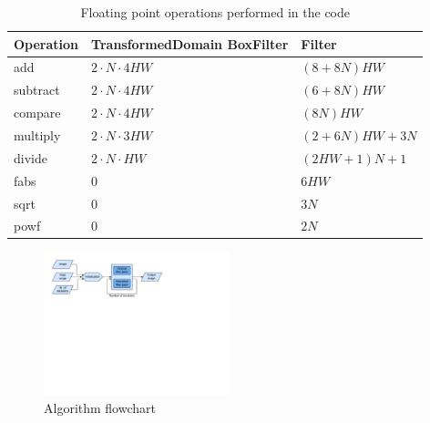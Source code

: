 \begin{table}[h]
\label{cost_analysis}
\centering
\begin{tabular}{| l | p{3cm} | p{3cm} |} \hline 
Operation & TransformedDomain BoxFilter  & Filter \\ \hline
add & $2 \cdot N \cdot 4HW$ & $(8 + 8N)HW$ \\ \hline
subtract & $2 \cdot N \cdot 4HW$ & $(6 + 8N)HW$ \\ \hline
compare & $2 \cdot  N \cdot 4HW$ & $(8N)HW$ \\ \hline
multiply & $2 \cdot N \cdot 3HW$ & $(2 + 6N)HW + 3N$ \\ \hline
divide & $2 \cdot N \cdot HW$ & $(2HW + 1)N + 1$ \\ \hline
fabs & $0$ & $6HW$ \\ \hline
sqrt & $0$ & $3N$ \\ \hline
powf  & $0$ & $2N$ \\ \hline
\end{tabular}
\caption{Floating point operations performed in the code}
\end{table}

\begin{figure}\vspace{-1mm}
  \includegraphics[trim=10mm 145mm 100mm 10mm, clip, width=0.48\textwidth]{figures/flowchart.pdf}
  \caption{Algorithm flowchart\label{flowchart}}
\end{figure}

